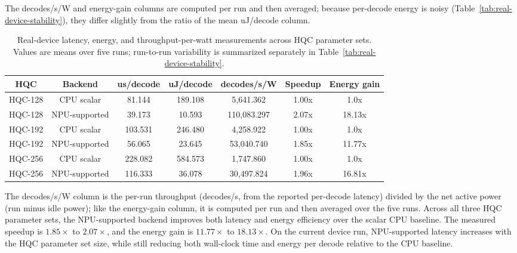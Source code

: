 \begin{table}[htbp]
\centering
\renewcommand{\arraystretch}{1.15}

\begin{tablenotes}
\footnotesize
\item The decodes/s/W and energy-gain columns are computed per run and then
averaged; because per-decode energy is noisy
(Table~\ref{tab:real-device-stability}), they differ slightly from the ratio
of the mean uJ/decode column.
\end{tablenotes}
\small

\begin{tabular}{|c|c|c|c|c|c|c|}
\hline
\textbf{HQC} & \textbf{Backend} & \textbf{us/decode} & \textbf{uJ/decode} &
\textbf{decodes/s/W} & \textbf{Speedup} & \textbf{Energy gain} \\
\hline
HQC-128 & CPU scalar    & 81.144  & 189.108 & 5,641.362  & 1.00x & 1.0x  \\
\hline
HQC-128 & NPU-supported & 39.173  & 10.593  & 110,083.297 & 2.07x & 18.13x \\
\hline
HQC-192 & CPU scalar    & 103.531 & 246.480 & 4,258.922  & 1.00x & 1.0x  \\
\hline
HQC-192 & NPU-supported & 56.065  & 23.645  & 53,040.740 & 1.85x & 11.77x \\
\hline
HQC-256 & CPU scalar    & 228.082 & 584.573 & 1,747.860  & 1.00x & 1.0x  \\
\hline
HQC-256 & NPU-supported & 116.333 & 36.078  & 30,497.824 & 1.96x & 16.81x \\
\hline
\end{tabular}
\vspace{0.5em}

\caption{Real-device latency, energy, and throughput-per-watt measurements across HQC parameter sets. Values are means over five runs; run-to-run variability is summarized separately in Table~\ref{tab:real-device-stability}.}
\label{tab:real-device-latency-energy}
\end{table}

The decodes/s/W column is the per-run throughput (decodes/s, from the reported per-decode latency) divided by the net active power (run minus idle power); like the energy-gain column, it is computed per run and then averaged over the five runs. Across all three HQC parameter sets, the NPU-supported backend improves both latency and energy efficiency over the scalar CPU baseline. The measured speedup is \(1.85\times\) to \(2.07\times\), and the energy gain is \(11.77\times\) to \(18.13\times\). On the current device run, NPU-supported latency increases with the HQC parameter set size, while still reducing both wall-clock time and energy per decode relative to the CPU baseline.

